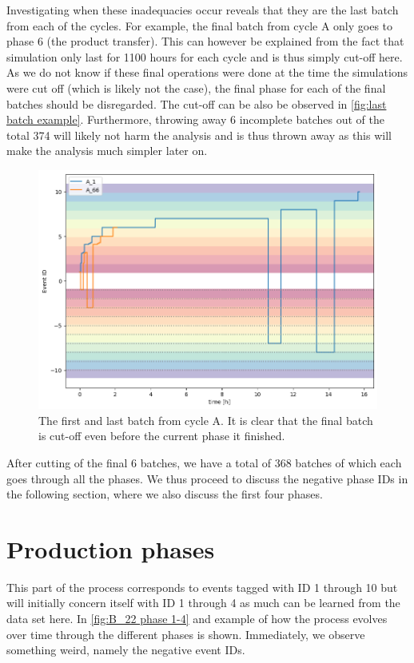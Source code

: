 \documentclass[../Thesis.tex]{subfiles}
\begin{document}
Investigating when these inadequacies occur reveals that they are the last batch from each of the cycles. For example, the final batch from cycle A only goes to phase 6 (the product transfer). This can however be explained from the fact that simulation only last for 1100 hours for each cycle and is thus simply cut-off here. As we do not know if these final operations were done at the time the simulations were cut off (which is likely not the case), the final phase for each of the final batches should be disregarded. The cut-off can be also be observed in \autoref{fig:last batch example}. Furthermore, throwing away 6 incomplete batches out of the total 374 will likely not harm the analysis and is thus thrown away as this will make the analysis much simpler later on.

\begin{figure}[h]
    \centering
    \includegraphics[width=0.8\linewidth]{figures/Multiple cycles data/tailing batch short.png}
    \caption{The first and last batch from cycle A. It is clear that the final batch is cut-off even before the current phase it finished.}
    \label{fig:last batch example}
\end{figure}

After cutting of the final 6 batches, we have a total of 368 batches of which each goes through all the phases. We thus proceed to discuss the negative phase IDs in the following section, where we also discuss the first four phases.




\newpage

\section{Production phases}
This part of the process corresponds to events tagged with ID 1 through 10 but will initially concern itself with ID 1 through 4 as much can be learned from the data set here. In \autoref{fig:B_22 phase 1-4} and example of how the process evolves over time through the different phases is shown. Immediately, we observe something weird, namely the negative event IDs.
\end{document}

